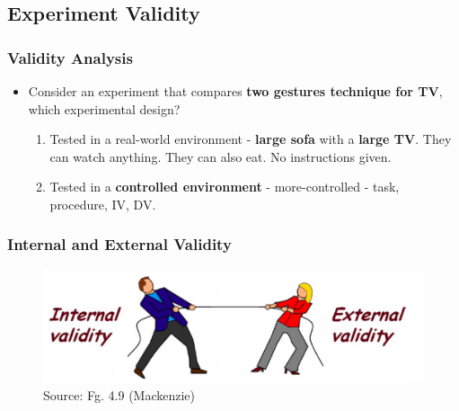 \documentclass{beamer}
\begin{document}
%

\subsection{Experiment Validity}

\begin{frame}
\frametitle{Validity Analysis}
\begin{itemize}
\item Consider an experiment that compares \textbf{two gestures technique for TV}, which experimental design?
\begin{enumerate}
\item  Tested in a real-world environment -  \textbf{large sofa} with a \textbf{large TV}.  They can watch anything.  They can also eat.  No instructions given.
\item Tested in a \textbf{controlled environment} - more-controlled - task, procedure, IV, DV.
\end{enumerate}
\end{itemize}
\end{frame}

\begin{frame}
\frametitle{Internal and External Validity}
\begin{figure}
\includegraphics[width=0.9\linewidth]{internalexternal2}
\caption{Source: Fg. 4.9 (Mackenzie)}
\end{figure}
\end{frame}
\end{document}
